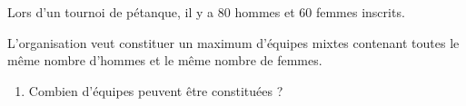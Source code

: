 \begin{exo}{}
	Lors d'un tournoi de pétanque, il y a $80$ hommes et $60$ femmes inscrits.

	L'organisation veut constituer un maximum d'équipes mixtes contenant toutes le même nombre d'hommes et le même nombre de femmes.

	\begin{enumerate}
		\item Combien d'équipes peuvent être constituées ?
	\end{enumerate}
\end{exo}
